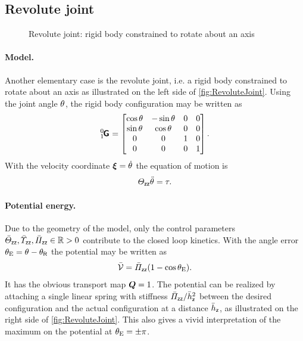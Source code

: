 \subsection{Revolute joint}\label{sec:CtrlExampleRevoluteJoint}
\begin{figure}
 \centering
 
 \caption{Revolute joint: rigid body constrained to rotate about an axis}
 \label{fig:RevoluteJoint}
\end{figure}

\paragraph{Model.}
Another elementary case is the revolute joint, i.e. a rigid body constrained to rotate about an axis as illustrated on the left side of \autoref{fig:RevoluteJoint}.
Using the joint angle $\theta_{}$, the rigid body configuration may be written as
\begin{align}
 \bodyHomoCoord{0}{1} = \begin{bmatrix} \cos\jointAngle & -\sin\jointAngle & 0 & 0 \\ \sin\jointAngle & \cos\jointAngle & 0 & 0 \\ 0 & 0 & 1 & 0 \\ 0 & 0 & 0 & 1\end{bmatrix}.
\end{align}
With the velocity coordinate $\boldsymbol{\xi} = \dot{\theta}_{}$ the equation of motion is
\begin{align}\label{eq:RevoluteJointModel}
 \varTheta_{\mathsf{z}\mathsf{z}} \ddot{\theta}_{} = \tau.
\end{align}

\paragraph{Potential energy.}
Due to the geometry of the model, only the control parameters $\bar{\varTheta}_{\mathsf{z}\mathsf{z}}, \bar{\varUpsilon}_{\mathsf{z}\mathsf{z}}, \bar{\varPi}_{\mathsf{z}\mathsf{z}} \in \mathbb{R} > 0$ contribute to the closed loop kinetics.
With the angle error $\theta_{\mathrm{E}} = \theta_{} - \theta_{\mathsf{R}}$ the potential may be written as
\begin{align}
 \bar{\mathcal{V}} = \bar{\varPi}_{\mathsf{z}\mathsf{z}} (1 - \cos\theta_{\mathrm{E}}).
\end{align}
It has the obvious transport map $\boldsymbol{Q} = 1$.
The potential can be realized by attaching a single linear spring with stiffness $\bar{\varPi}_{\mathsf{z}\mathsf{z}} / \bar{h}_{\mathsf{z}}^2$ between the desired configuration and the actual configuration at a distance $\bar{h}_{\mathsf{z}}$, as illustrated on the right side of \autoref{fig:RevoluteJoint}.
This also gives a vivid interpretation of the maximum on the potential at $\theta_{\mathrm{E}} = \pm\pi$.

